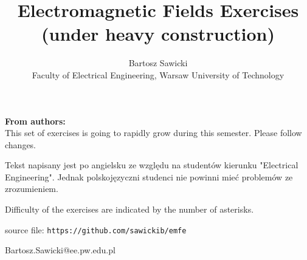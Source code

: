\documentclass[10pt,a4paper]{article}
\title{Electromagnetic Fields Exercises\\ \vspace{0.5cm} \large{(under heavy construction)}}
\author{Bartosz Sawicki \\ \small{Faculty of Electrical Engineering, Warsaw University of Technology}}
\begin{document}
\maketitle

\noindent\textbf{From authors:}\\
This set of exercises is going to rapidly grow during this semester. Please follow changes. 

Tekst napisany jest po angielsku ze względu na studentów kierunku "Electrical Engineering". Jednak polskojęzyczni studenci nie powinni mieć problemów ze zrozumieniem.

Difficulty of the exercises are indicated by the number of asterisks. 

source file: \verb+https://github.com/sawickib/emfe+

\vspace{0.3cm}
\begin{flushright}
Bartosz.Sawicki@ee.pw.edu.pl
\end{flushright}

\tableofcontents

\newpage





\end{document}
